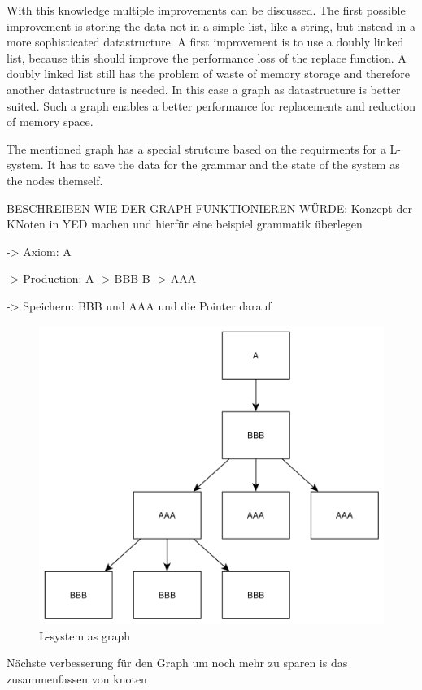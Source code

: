 \documentclass[english]{cpp-hmwk}
\begin{document}
\medskip
\noindent With this knowledge multiple improvements can be discussed. The first possible improvement is storing the data not in a simple list, like a string, but instead in a more sophisticated datastructure. A first improvement is to use a doubly linked list, because this should improve the performance loss of the replace function. A doubly linked list still has the problem of waste of memory storage and therefore another datastructure is needed. In this case a graph as datastructure is better suited. Such a graph enables a better performance for replacements and reduction of memory space.

\medskip
\noindent The mentioned graph has a special strutcure based on the requirments for a L-system. It has to save the data for the grammar and the state of the system as the nodes themself.


BESCHREIBEN WIE DER GRAPH FUNKTIONIEREN WÜRDE: Konzept der KNoten in YED machen und hierfür eine beispiel grammatik überlegen

-> Axiom: A

-> Production:  A -> BBB
		    B -> AAA
		    
-> Speichern: BBB und AAA und die Pointer darauf

\begin{figure}[h!]
	\centering
	\includegraphics[width=0.8\columnwidth]{../graphs/LSystem/examples/lsystem_graph_example.png}
	\caption{L-system as graph}
	\label{figure:lsystem_graph}
\end{figure}


Nächste verbesserung für den Graph um noch mehr zu sparen is das zusammenfassen von knoten
\end{document}
